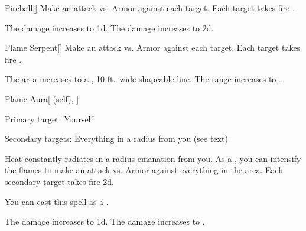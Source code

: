 \lowercase{\hypertarget{spell:Fireball}{}}\label{spell:Fireball}
\begin{freeability}[Rank 3]{\hypertarget{spell:Fireball}{Fireball}}[]
Make an attack vs. Armor against each target.
\hit Each target takes fire .

\rankline
{} The damage increases to  \plus1d.
 The damage increases to  \plus2d.
\end{freeability}
\vspace{0.25em}



\lowercase{\hypertarget{spell:Flame Serpent}{}}\label{spell:Flame Serpent}
\begin{freeability}[Rank 3]{\hypertarget{spell:Flame Serpent}{Flame Serpent}}[]
Make an attack vs. Armor against each target.
\hit Each target takes fire .

\rankline
{} The area increases to a \arealarge, 10 ft.\ wide shapeable line.
 The range increases to \rnglong.
\end{freeability}
\vspace{0.25em}



\lowercase{\hypertarget{spell:Flame Aura}{}}\label{spell:Flame Aura}
\begin{attuneability}[Rank 4]{\hypertarget{spell:Flame Aura}{Flame Aura}}[ (self), ]

Primary target: Yourself
\par\noindent
Secondary targets: Everything in a \areasmall radius from you (see text)

Heat constantly radiates in a \areasmall radius emanation from you.
As a , you can intensify the flames to make an attack vs. Armor against everything in the area.
\hit Each secondary target takes fire  \minus2d.

You can cast this spell as a .

\rankline
{} The damage increases to  \minus1d.
 The damage increases to .
\end{attuneability}
\vspace{0.25em}




